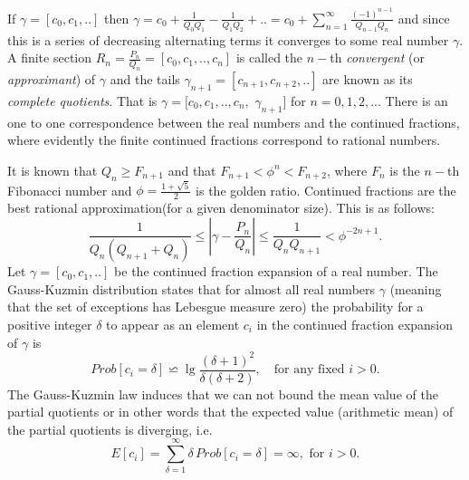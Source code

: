 \documentclass{sig-alternate}
\newcommand{\dott}{{..}}
\begin{document}
If $\gamma = [c_0, c_1, \dott]$ then 
$
\gamma = c_0 + \frac{1}{Q_0 Q_1} - \frac{1}{Q_1 Q_2} + \dott
= c_0 + \sum_{n=1}^{\infty}{ \frac{(-1)^{n-1}}{Q_{n-1}Q_n}}
$ 
and since this is a series of decreasing alternating terms it converges to some real
number $\gamma$.
A finite section $R_n = \frac{P_n}{Q_n} = [ c_0, c_1, \dott, c_n]$
is called the $n-$th {\em convergent} (or {\em approximant}) of $\gamma$
and the tails $\gamma_{n+1} = [c_{n+1}, c_{n+2}, \dott]$  are known as its
{\em complete quotients}. 
That is $\gamma = [ c_0, c_1, \dott, c_n,$ $ \gamma_{n+1}]$
for $n=0,1,2,\dott$.
There is an one to one correspondence between the real numbers and the continued
fractions, where evidently the finite continued fractions correspond
to rational numbers.

It is known that $Q_n \geq F_{n+1}$ 
and that $F_{n+1} < \phi^n < F_{n+2}$, 
where $F_n$ is the $n-$th Fibonacci number 
and $\phi = \frac{1+ \sqrt{5}}{2}$ is the golden ratio.
Continued fractions are the best rational approximation(for a given denominator size).
This is as follows:
\begin{equation}
  \label{eq:cf-approx}
  \frac{1}{Q_n(Q_{n+1} +Q_n)} 
  \leq \left| \gamma - \frac{P_n}{Q_n} \right| 
  \leq \frac{1}{Q_n Q_{n+1}} < \phi^{-2n+1}.
\end{equation}
Let $\gamma = [c_0, c_1, \dott]$ be the continued fraction expansion of a real
number. The Gauss-Kuzmin distribution
\cite{BomPoo:contfrac:95}
states that for almost all real numbers $\gamma$ (meaning that the set
of exceptions has Lebesgue measure zero) the probability for a
positive integer $\delta$ to appear as an element $c_i$ in the
continued fraction expansion of $\gamma$ is  
\begin{equation}
  Prob[ c_i = \delta ] \backsimeq
  \lg{\frac{(\delta+1)^2}{\delta(\delta+2)}}, \quad \text{for any fixed } i > 0.
\label{eq:Gauss-Kuzmin}
\end{equation}
The Gauss-Kuzmin law induces that we can not bound the mean value 
of the partial quotients 
or in other words that the expected value (arithmetic mean) of the partial
quotients is diverging, i.e. 
\begin{displaymath}
  E[c_i] = \sum_{\delta=1}^{\infty}{ \delta\, Prob[ c_i = \delta ]}= \infty,
  \text{ for } i >0.
\end{displaymath}
\end{document}
